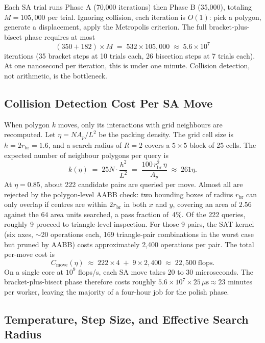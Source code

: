 \documentclass[10pt,twocolumn]{article}
\begin{document}
Each SA trial runs Phase A (70{,}000 iterations) then Phase B
(35{,}000), totaling $M = 105{,}000$ per trial. Ignoring collision,
each iteration is $O(1)$: pick a polygon, generate a displacement,
apply the Metropolis criterion. The full bracket-plus-bisect phase
requires at most
\[
  (350 + 182) \times M
  \;=\; 532 \times 105{,}000
  \;\approx\; 5.6 \times 10^7
\]
iterations (35 bracket steps at 10 trials each, 26 bisection steps at
7 trials each). At one nanosecond per iteration, this is under one
minute. Collision detection, not arithmetic, is the bottleneck.

\subsection{Collision Detection Cost Per SA Move}

When polygon $k$ moves, only its interactions with grid neighbours
are recomputed. Let $\eta = NA_p/L^2$ be the packing density. The
grid cell size is $h = 2r_{\mathrm{br}} = 1.6$, and a search radius of
$R = 2$ covers a $5 \times 5$ block of 25 cells. The expected number of
neighbour polygons per query is
\begin{equation}
  k(\eta)
  \;=\; 25N\cdot\frac{h^2}{L^2}
  \;=\; \frac{100\,r_{\mathrm{br}}^2\,\eta}{A_p}
  \;\approx\; 261\eta.
  \label{eq:kneigh}
\end{equation}
At $\eta = 0.85$, about 222 candidate pairs are queried per move.
Almost all are rejected by the polygon-level AABB check: two bounding
boxes of radius $r_{\mathrm{br}}$ can only overlap if centres are
within $2r_{\mathrm{br}}$ in both $x$ and $y$, covering an area of
$2.56$ against the $64$ area units searched, a pass fraction of~4\%.
Of the 222 queries, roughly 9 proceed to triangle-level inspection.
For those 9 pairs, the SAT kernel (six axes, $\sim$20 operations each,
169 triangle-pair combinations in the worst case but pruned by AABB)
costs approximately 2{,}400 operations per pair. The total per-move cost is
\begin{equation}
  C_{\mathrm{move}}(\eta)
  \;\approx\; 222\times 4 \;+\; 9\times 2{,}400
  \;\approx\; 22{,}500 \;\text{flops.}
  \label{eq:movecost}
\end{equation}
On a single core at $10^9$ flops/s, each SA move takes 20 to 30
microseconds. The bracket-plus-bisect phase therefore costs roughly
$5.6 \times 10^7 \times 25\,\mu\mathrm{s} \approx 23$ minutes per
worker, leaving the majority of a four-hour job for the polish phase.

\subsection{Temperature, Step Size, and Effective Search Radius}
\label{sec:temp}
\end{document}
